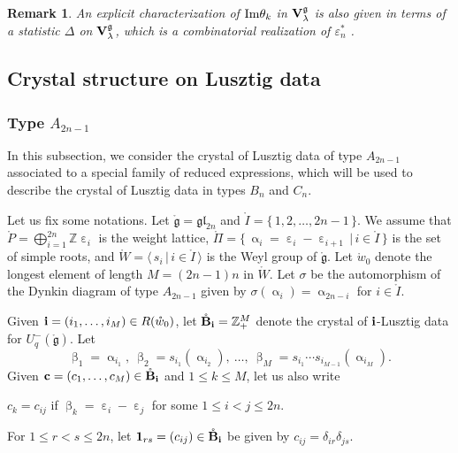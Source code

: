 \documentclass[leqno,11pt]{amsart}
\newtheorem{rem}[thm]{\bf Remark}
\numberwithin{equation}{section}
\newcommand{\bs}{\boldsymbol}
\newcommand{\B}{\mathbf{B}}
\newcommand{\bi}{\bs{\rm i}}
\newcommand{\gl}{\mathfrak{gl}}
\newcommand{\Z}{\mathbb{Z}}
\newcommand{\g}{\mathfrak{g}}
\newcommand{\mf}{\mathfrak}
\newcommand{\la}{\lambda}
\begin{document}
\begin{rem}{\rm
An explicit characterization of ${\rm Im}\theta_k$ in ${\bf V}^\g_\la$ is also given in terms of a statistic $\Delta$ on ${\bf V}^\g_\la$, which is a combinatorial realization of $\varepsilon_n^\ast$ \cite[Definition 3.10, Theorem 3.11]{K12}.
}
\end{rem}


\subsection{Crystal structure on Lusztig data}

\subsubsection{Type $A_{2n-1}$}\label{subsec:type A crystal}  In this subsection, we consider the crystal of  Lusztig data of type $A_{2n-1}$ associated to a special family of reduced expressions, which will be used to describe the crystal of Lusztig data in types $B_n$ and $C_n$.

Let us fix some notations.
Let $\mathring{\mf g}=\gl_{2n}$ and $\mathring{I}=\{\,1,2,\ldots,2n-1\,\}$. We assume that $\mathring{P}=\bigoplus_{i=1}^{2n}\Z \upepsilon_i$ is the weight lattice, $\mathring{\Pi}=\{\,\upalpha_i= \upepsilon_i- \upepsilon_{i+1}\,|\,i\in \mathring{I}\,\}$ is the set of simple roots, and $\mathring{W}=\langle\, s_i\,|\,i\in \mathring{I}\,\rangle$ is the Weyl group of $\mathring{\g}$. Let $\mathring{w}_0$ denote  the longest element of length $M=(2n-1)n$ in $\mathring{W}$. Let $\sigma$ be the automorphism of the Dynkin diagram of type $A_{2n-1}$ given by $\sigma(\upalpha_i)=\upalpha_{2n-i}$ for $i\in \mathring{I}$.

Given ${\bi}=(i_1,\ldots,i_M)\in R(\mathring{w}_0)$, let $\mathring{\B}_{\bi}=\Z_+^{M}$ denote the crystal of $\bi$-Lusztig data for $U_q^-(\mathring{\g})$.
Let 
\begin{equation*}
\upbeta_1=\upalpha_{i_1},\  \upbeta_2=s_{i_1}(\upalpha_{i_2}), \ \ldots ,\ \upbeta_M=s_{i_1}\cdots s_{i_{M-1}}(\upalpha_{i_{M}}).
\end{equation*}
Given ${\bf c}=(c_1,\ldots,c_M)\in \mathring{\B}_{\bi}$ and $1\leq k\leq M$, let us also write 
\begin{center}
$c_k=c_{ij}$ if $\upbeta_k=\upepsilon_i-\upepsilon_j$ for some $1\leq i<j\leq 2n$.
\end{center} 
For $1\leq r<s\leq 2n$, let ${\bf 1}_{rs}=(c_{ij})\in \mathring{\B}_{{\bi}}$ be given by $c_{ij}=\delta_{ir}\delta_{js}$. 
\end{document}
